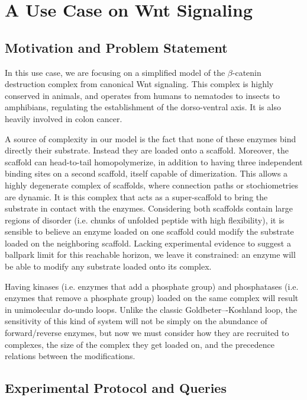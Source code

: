 \section{A Use Case on Wnt Signaling}


\subsection{Motivation and Problem Statement}

In this use case, we are focusing on a simplified model of the
$\beta$-catenin destruction complex from canonical Wnt signaling. This
complex is highly conserved in animals, and operates from humans to
nematodes to insects to amphibians, regulating the establishment of
the dorso-ventral axis. It is also heavily involved in colon cancer.

A source of complexity in our model is the fact that none of these
enzymes bind directly their substrate. Instead they are loaded onto a
scaffold. Moreover, the scaffold can head-to-tail homopolymerize, in
addition to having three independent binding sites on a second
scaffold, itself capable of dimerization. This allows a highly
degenerate complex of scaffolds, where connection paths or
stochiometries are dynamic. It is this complex that acts as a
super-scaffold to bring the substrate in contact with the
enzymes. Considering both scaffolds contain large regions of disorder
(i.e. chunks of unfolded peptide with high flexibility), it is
sensible to believe an enzyme loaded on one scaffold could modify the
substrate loaded on the neighboring scaffold. Lacking experimental
evidence to suggest a ballpark limit for this reachable horizon, we
leave it constrained: an enzyme will be able to modify any substrate
loaded onto its complex.

Having kinases (i.e. enzymes that add a phosphate group) and
phosphatases (i.e. enzymes that remove a phosphate group) loaded on
the same complex will result in unimolecular do-undo loops. Unlike
the classic Goldbeter–-Koshland loop, the sensitivity of this kind of
system will not be simply on the abundance of forward/reverse enzymes,
but now we must consider how they are recruited to complexes, the size
of the complex they get loaded on, and the precedence relations
between the modifications.


\subsection{Experimental Protocol and Queries}


